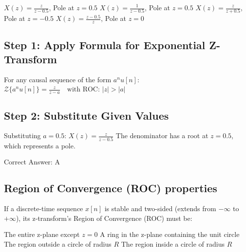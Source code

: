 \begin{choices}
    \correctchoice $X(z) = \frac{z}{z - 0.5}$, Pole at $z = 0.5$
    \choice $X(z) = \frac{1}{z - 0.5}$, Pole at $z = 0.5$
    \choice $X(z) = \frac{z}{z + 0.5}$, Pole at $z = -0.5$
    \choice $X(z) = \frac{z-0.5}{z}$, Pole at $z = 0$
\end{choices}

\begin{solution}

\subsection*{Step 1: Apply Formula for Exponential Z-Transform}
For any causal sequence of the form $a^n u[n]$:
$\mathcal{Z}\{a^n u[n]\} = \frac{z}{z-a}\quad \text{with ROC: } |z| > |a|$

\subsection*{Step 2: Substitute Given Values}
Substituting $a = 0.5$:
$X(z) = \frac{z}{z - 0.5}$
The denominator has a root at $z = 0.5$, which represents a pole.

Correct Answer: A
\end{solution}

\clearpage

\subsection{Region of Convergence (ROC) properties}

If a discrete-time sequence $x[n]$ is stable and two-sided (extends from $-\infty$ to $+\infty$), its z-transform's Region of Convergence (ROC) must be:

\begin{choices}
    \choice The entire z-plane except $z=0$
    \correctchoice A ring in the z-plane containing the unit circle
    \choice The region outside a circle of radius $R$
    \choice The region inside a circle of radius $R$
\end{choices}

